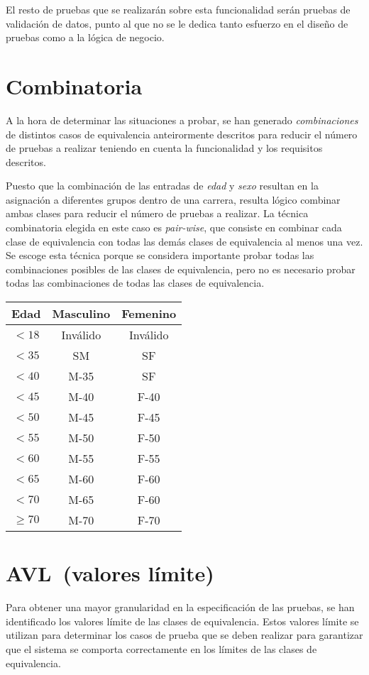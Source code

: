 El resto de pruebas que se realizarán sobre esta funcionalidad serán pruebas de validación
de datos, punto al que no se le dedica tanto esfuerzo en el diseño de pruebas como a la
lógica de negocio.

\section{Combinatoria}
A la hora de determinar las situaciones a probar, se han generado \textit{combinaciones} de
distintos casos de equivalencia anteirormente descritos para reducir el número de pruebas a
realizar teniendo en cuenta la funcionalidad y los requisitos descritos.

Puesto que la combinación de las entradas de \textit{edad} y \textit{sexo} resultan en la
asignación a diferentes grupos dentro de una carrera, resulta lógico combinar ambas clases
para reducir el número de pruebas a realizar. La técnica combinatoria elegida en este caso
es \textit{pair-wise}, que consiste en combinar cada clase de equivalencia con todas las demás
clases de equivalencia al menos una vez. Se escoge esta técnica porque se considera importante
probar todas las combinaciones posibles de las clases de equivalencia, pero no es necesario
probar todas las combinaciones de todas las clases de equivalencia.

\begin{table}[ht]
	\centering
	\begin{tabular}{|c|c|c|}
		\hline
		\textbf{Edad} & \textbf{Masculino} & \textbf{Femenino} \\
		\hline
		\hline
		$<18$ & Inválido \cellcolor{red!25} & Inválido \cellcolor{red!25} \\
		$<35$ & SM & SF \\
		$<40$ & M-35 & SF \\
		$<45$ & M-40 & F-40 \\
		$<50$ & M-45 & F-45 \\
		$<55$ & M-50 & F-50 \\
		$<60$ & M-55 & F-55 \\
		$<65$ & M-60 & F-60 \\
		$<70$ & M-65 & F-60 \\
		$\geq 70$ & M-70 & F-70 \\
		\hline
	\end{tabular}
\end{table}

\section{AVL~(valores límite)}
Para obtener una mayor granularidad en la especificación de las pruebas, se han identificado
los valores límite de las clases de equivalencia. Estos valores límite se utilizan para
determinar los casos de prueba que se deben realizar para garantizar que el sistema se
comporta correctamente en los límites de las clases de equivalencia.

